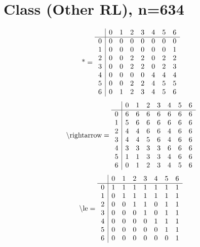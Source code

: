 \documentclass[11pt]{article}
\begin{document}
\section{Class (Other RL), n=634}
\[\text{*} = 
\begin{array}{r | r r r r r r r}
 & 0 & 1 & 2 & 3 & 4 & 5 & 6 \\ \hline
0 & 0 & 0 & 0 & 0 & 0 & 0 & 0 \\
1 & 0 & 0 & 0 & 0 & 0 & 0 & 1 \\
2 & 0 & 0 & 2 & 2 & 0 & 2 & 2 \\
3 & 0 & 0 & 2 & 2 & 0 & 2 & 3 \\
4 & 0 & 0 & 0 & 0 & 4 & 4 & 4 \\
5 & 0 & 0 & 2 & 2 & 4 & 5 & 5 \\
6 & 0 & 1 & 2 & 3 & 4 & 5 & 6 \\
\end{array}
\]
\[\text{\textbackslash rightarrow} = 
\begin{array}{r | r r r r r r r}
 & 0 & 1 & 2 & 3 & 4 & 5 & 6 \\ \hline
0 & 6 & 6 & 6 & 6 & 6 & 6 & 6 \\
1 & 5 & 6 & 6 & 6 & 6 & 6 & 6 \\
2 & 4 & 4 & 6 & 6 & 4 & 6 & 6 \\
3 & 4 & 4 & 5 & 6 & 4 & 6 & 6 \\
4 & 3 & 3 & 3 & 3 & 6 & 6 & 6 \\
5 & 1 & 1 & 3 & 3 & 4 & 6 & 6 \\
6 & 0 & 1 & 2 & 3 & 4 & 5 & 6 \\
\end{array}
\]
\[\text{\textbackslash le} = 
\begin{array}{r | r r r r r r r}
 & 0 & 1 & 2 & 3 & 4 & 5 & 6 \\ \hline
0 & 1 & 1 & 1 & 1 & 1 & 1 & 1 \\
1 & 0 & 1 & 1 & 1 & 1 & 1 & 1 \\
2 & 0 & 0 & 1 & 1 & 0 & 1 & 1 \\
3 & 0 & 0 & 0 & 1 & 0 & 1 & 1 \\
4 & 0 & 0 & 0 & 0 & 1 & 1 & 1 \\
5 & 0 & 0 & 0 & 0 & 0 & 1 & 1 \\
6 & 0 & 0 & 0 & 0 & 0 & 0 & 1 \\
\end{array}
\]
\end{document}
